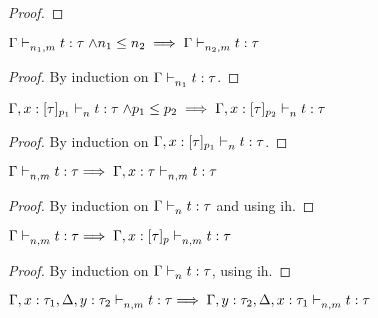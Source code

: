 \documentclass{article}
\begin{document}
\begin{proof}
\end{proof}

\begin{lemma} 
	\label{lem:deweaken1}
	$\Gamma \mathrel{\vdash_{n_1,m}^{} {t} : {\tau}} \land n_1 \leq n_2 \implies \Gamma \mathrel{\vdash_{n_2,m}^{} {t} : {\tau}}$\\
\end{lemma}
\begin{proof}
  By induction on $\Gamma \mathrel{\vdash_{n_1}^{} {t} : {\tau}}  $.
\end{proof}

\begin{lemma} 
	\label{lem:deweaken2}
	$\Gamma, x:[\tau]_{p_1} \mathrel{\vdash_{n}^{} {t} : {\tau}} \land p_1 \leq p_2 \implies \Gamma, x:[\tau]_{p_2} \mathrel{\vdash_{n}^{} {t} : {\tau}} $\\
\end{lemma}
\begin{proof}
  By induction on $\Gamma, x:[\tau]_{p_1} \mathrel{\vdash_{n}^{} {t} : {\tau}}  $.
\end{proof}

\begin{lemma}
    \label{lem:coweaken1}
    $\Gamma \mathrel{\vdash_{n,m}^{} {t} : {\tau}}  \implies \Gamma, x:\tau \mathrel{\vdash_{n,m}^{} {t} : {\tau}} $\\
\end{lemma}
\begin{proof}
  By induction on $\Gamma \mathrel{\vdash_{n}^{} {t} : {\tau}}  $ and using ih.
\end{proof}

\begin{lemma}
    \label{lem:coweaken2}
    $\Gamma \mathrel{\vdash_{n,m}^{} {t} : {\tau}}  \implies \Gamma, x:[\tau]_p \mathrel{\vdash_{n,m}^{} {t} : {\tau}} $\\
\end{lemma}
\begin{proof}
  By induction on $\Gamma \mathrel{\vdash_{n}^{} {t} : {\tau}} $, using ih.
\end{proof}


\begin{lemma}
    \label{lem:coex}
    $\Gamma, x : \tau_1, \Delta, y : \tau_2 \mathrel{\vdash_{n,m}^{} {t} : {\tau}}  \implies \Gamma, y : \tau_2, \Delta, x : \tau_1 \mathrel{\vdash_{n,m}^{} {t} : {\tau}} $\\
\end{lemma}
\end{document}
